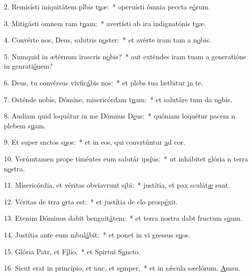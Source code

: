 2. Remisísti iniquitátem plbis t\uline{u}æ:~* operuísti ómnia peccta e\uline{ó}rum.\par 
3. Mitigásti omnem ram t\uline{u}am:~* avertísti ab ira indignatónis t\uline{u}æ.\par 
4. Convérte nos, Deus, salutris n\uline{o}ster:~* et avérte iram tam a n\uline{o}bis.\par 
5. Numquid in ætérnum irascris n\uline{o}bis?~* aut exténdes iram tuam a generatióne in genrati\uline{ó}nem?\par 
6. Deus, tu convérsus vivfic\uline{á}bis nos:~* et plebs tua lætbitur \uline{i}n te.\par 
7. Osténde nobis, Dómine, misericórdam t\uline{u}am:~* et salutáre tum da n\uline{o}bis.\par 
8. Audiam quid loquátur in me Dómnus D\uline{e}us:~* quóniam loquétur pacem n plebem s\uline{u}am.\par 
9. Et super snctos s\uline{u}os:~* et in eos, qui convrtúntur \uline{a}d cor.\par 
10. Verúmtamen prope timéntes eum salutár ips\uline{í}us:~* ut inhábitet glória n terra n\uline{o}stra.\par 
11. Misericórdia, et véritas obviavrunt s\uline{i}bi:~* justítia, et pax sculát\uline{æ} sunt.\par 
12. Véritas de trra \uline{o}rta est:~* et justítia de clo prosp\uline{é}xit.\par 
13. Etenim Dóminus dabit bengnit\uline{á}tem:~* et terra nostra dabt fructum s\uline{u}um.\par 
14. Justítia ante eum mbul\uline{á}bit:~* et ponet in vi gressus s\uline{u}os.\par 
15. Glória Patr, et F\uline{í}lio,~* et Spirtui S\uline{a}ncto.\par 
16. Sicut erat in princípio, et nnc, et s\uline{e}mper,~* et in sǽcula sæclórum. \uline{A}men.\par 
